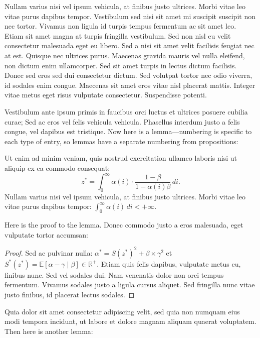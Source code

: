 Nullam varius nisi vel ipsum vehicula, at finibus justo ultrices. Morbi vitae leo vitae purus dapibus tempor. Vestibulum sed nisi sit amet mi suscipit suscipit non nec tortor. Vivamus non ligula id turpis tempus fermentum ac sit amet leo. Etiam sit amet magna at turpis fringilla vestibulum. Sed non nisl eu velit consectetur malesuada eget eu libero. Sed a nisi sit amet velit facilisis feugiat nec at est. Quisque nec ultrices purus. Maecenas gravida mauris vel nulla eleifend, non dictum enim ullamcorper. Sed sit amet turpis in lectus dictum facilisis. Donec sed eros sed dui consectetur dictum. Sed volutpat tortor nec odio viverra, id sodales enim congue. Maecenas sit amet eros vitae nisl placerat mattis. Integer vitae metus eget risus vulputate consectetur. Suspendisse potenti.

Vestibulum ante ipsum primis in faucibus orci luctus et ultrices posuere cubilia curae; Sed ac eros vel felis vehicula vehicula. Phasellus interdum justo a felis congue, vel dapibus est tristique. Now here is a lemma---numbering is specific to each type of entry, so lemmas have a separate numbering from propositions:
\begin{lemma}\label{p:cv} Ut enim ad minim veniam, quis nostrud exercitation ullamco laboris nisi ut aliquip ex ea commodo consequat:
\begin{equation}
z^* = \int_{0}^{\infty} \alpha(i) \cdot \frac{1-\beta}{1-\alpha(i)\beta}\,di.
\label{e:cv}\end{equation}
Nullam varius nisi vel ipsum vehicula, at finibus justo ultrices. Morbi vitae leo vitae purus dapibus tempor: $ \int_{0}^{\infty} \alpha(i)\,di < +\infty$. 
\end{lemma}
Here is the proof to the lemma. Donec commodo justo a eros malesuada, eget vulputate tortor accumsan:
\begin{proof} 
Sed ac pulvinar nulla: $\alpha^* = S(z^*)^2 + \beta \times \gamma^2$ et $S^*(z^*)=\mathbb{E}[\alpha - \gamma \mid \beta] \in \mathbb{R}^+$. Etiam quis felis dapibus, vulputate metus eu, finibus nunc. Sed vel sodales dui. Nam venenatis dolor non orci tempus fermentum. Vivamus sodales justo a ligula cursus aliquet. Sed fringilla nunc vitae justo finibus, id placerat lectus sodales.
\end{proof} 

Quia dolor sit amet consectetur adipiscing velit, sed quia non numquam eius modi tempora incidunt, ut labore et dolore magnam aliquam quaerat voluptatem. Then here is another lemma:

